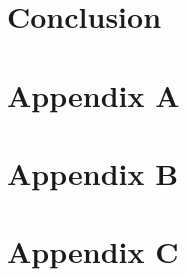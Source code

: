 \documentclass[12pt,a4paper]{report}
\begin{document}
\chapter{Conclusion}
\label{chap:conc}


% 



\chapter{Appendix A}
\label{chap:app}


\chapter{Appendix B}
\label{chap:app_b}


\chapter{Appendix C}
\label{chap:app_b}

\end{document}
